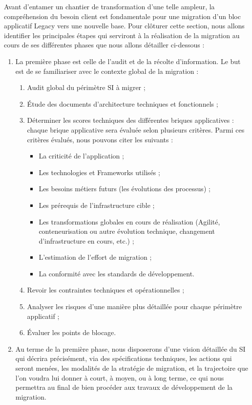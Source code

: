 Avant d'entamer un chantier de transformation d’une telle ampleur, la compréhension du besoin client est fondamentale pour une migration d’un bloc applicatif Legacy vers une nouvelle base. Pour clôturer cette section, nous allons identifier les principales étapes qui serviront à la réalisation de la migration au cours de ses différentes phases que nous allons détailler ci-dessous :\\ 

\begin{enumerate}
    \item La première phase est celle de l’audit et de la récolte d’information. Le but est de se familiariser avec le contexte global de la migration :
    \begin{enumerate}
        \item Audit global du périmètre SI à migrer ;
        \item Étude des documents d’architecture techniques et fonctionnels ;
        \item Déterminer les scores techniques des différentes briques applicatives : chaque brique applicative sera évaluée selon plusieurs critères. Parmi ces critères évalués, nous pouvons citer les suivants :
        \begin{itemize}
            \item La criticité de l’application ;
            \item Les technologies et Frameworks utilisés ;
            \item Les besoins métiers futurs (les évolutions des processus) ;
            \item Les prérequis de l’infrastructure cible ;
            \item Les transformations globales en cours de réalisation (Agilité, conteneurisation ou autre évolution technique, changement d’infrastructure en cours, etc.) ;
            \item L’estimation de l’effort de migration ;
            \item La conformité avec les standards de développement.
        \end{itemize}
        \item Revoir les contraintes techniques et opérationnelles ;
        \item Analyser les risques d’une manière plus détaillée pour chaque périmètre applicatif ;
        \item Évaluer les points de blocage.
    \end{enumerate}
    \item Au terme de la première phase, nous disposerons d'une vision détaillée du SI qui décrira précisément, via des spécifications techniques, les actions qui seront menées, les modalités de la stratégie de migration, et la trajectoire que l’on voudra lui donner à court, à moyen, ou à long terme, ce qui nous permettra au final de bien procéder aux travaux de développement de la migration.
\end{enumerate}
